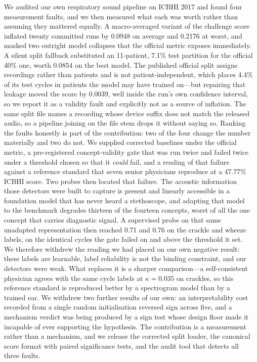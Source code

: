 \documentclass[journal,onecolumn]{IEEEtran}
\begin{document}
We audited our own respiratory sound pipeline on ICBHI 2017 and found four
measurement faults, and we then measured what each was worth rather than assuming they
mattered equally. A macro-averaged variant of the challenge score inflated twenty
committed runs by 0.0948 on average and 0.2176 at worst, and masked two outright model
collapses that the official metric exposes immediately. A silent split fallback
substituted an 11-patient, 7.1\% test partition for the official 40\% one, worth 0.0854
on the best model. The published official split assigns recordings rather than patients
and is not patient-independent, which places 4.4\% of its test cycles in patients the
model may have trained on---but repairing that leakage moved the score by 0.0039, well
inside the run's own confidence interval, so we report it as a validity fault and
explicitly not as a source of inflation. The same split file names a recording whose
device suffix does not match the released audio, so a pipeline joining on the file stem
drops it without saying so. Ranking the faults honestly is part of the contribution: two
of the four change the number materially and two do not. We
supplied corrected baselines under the official metric, a pre-registered
concept-validity gate that was run twice and failed twice under a threshold chosen so
that it \emph{could} fail, and a reading of that failure against a reference standard
that seven senior physicians reproduce at a 47.77\% ICBHI score. Two probes then located that failure. The acoustic information those
detectors were built to capture is present and linearly accessible in a foundation model
that has never heard a stethoscope, and adapting that model to the benchmark degrades
thirteen of the fourteen concepts, worst of all the one concept that carries diagnostic
signal. A supervised probe on that same unadapted representation then reached 0.71 and
0.76 on the crackle and wheeze labels, on the identical cycles the gate failed on and
above the threshold it set. We therefore withdrew the reading we had placed on our own
negative result: these labels are learnable, label reliability is not the binding
constraint, and our detectors were weak. What replaces it is a sharper comparison---a
self-consistent physician agrees with the same cycle labels at $\kappa=0.035$ on
crackles, so this reference standard is reproduced better by a spectrogram model than by
a trained ear. We withdrew two further results of our own: an interpretability cost
recorded from a single random initialisation reversed sign across five, and a mechanism
verdict was being produced by a sign test whose design floor made it incapable of ever
supporting the hypothesis. The contribution is a measurement rather than a mechanism,
and we release the corrected split loader, the canonical score format with paired
significance tests, and the audit tool that detects all three faults.
\end{document}
